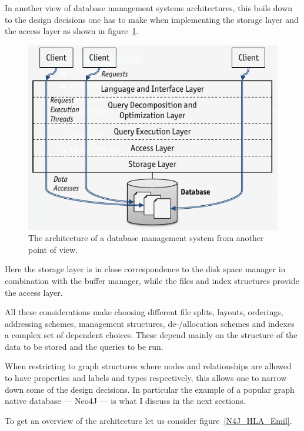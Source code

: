 \documentclass[a4paper,10pt]{article}
\begin{document}
In another view of database management systems architectures, this boils down to the design decisions one has to make when implementing the storage layer and the access layer as shown in figure~\ref{dbms_arch_layers}.

\begin{figure}[htp]\label{dbms_arch_layers}
 \begin{center}
  \includegraphics[keepaspectratio,width=\textwidth]{img/layered_RDBMS.png}
 \end{center}
 \caption{The architecture of a database management system from another point of view.} %
\end{figure}

Here the storage layer is in close correspondence to the disk space manager in combination with the buffer manager, while the files and index structures provide the access layer.

All these considerations make choosing different file splits, layouts, orderings, addressing schemes, management structures, de-/allocation schemes and indexes a complex set of dependent choices. 
These depend mainly on the structure of the data to be stored and the queries to be run. 

When restricting to graph structures where nodes and relationships are allowed to have properties and labels and types respectively, this allows one to narrow down some of the design decisions. In particular the example of a popular graph native database --- Neo4J --- is what I discuss in the next sections. 

To get an overview of the architecture let us consider figure~\ref{N4J_HLA_Emil}. 
\end{document}
